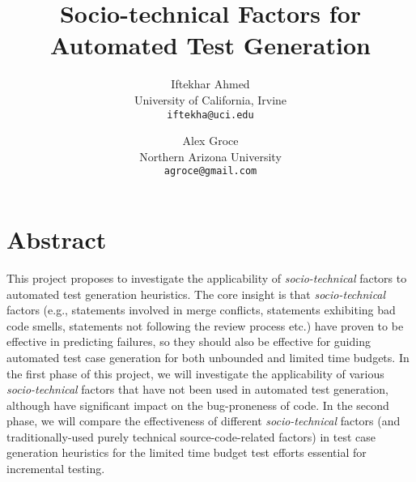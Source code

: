 \documentclass[10pt]{article}
\title{Socio-technical Factors for Automated Test Generation \vspace{-2ex}}
\author{
  Iftekhar Ahmed\\
  University of California, Irvine\\
  \texttt{iftekha@uci.edu} \vspace{-5ex}
  \and
  Alex Groce\\
  Northern Arizona University\\
  \texttt{agroce@gmail.com}\vspace{-5ex}
}
\date{}
\begin{document}
\maketitle


\section{Abstract}

This project proposes to investigate the applicability of \emph{socio-technical} factors to automated test generation heuristics. The core insight is that \emph{socio-technical} factors (e.g., statements involved in merge conflicts, statements exhibiting bad code smells, statements not following the review process  etc.) have proven to be effective in predicting failures, so they should also be effective for guiding automated test case generation for both unbounded and limited time budgets. In the first phase of this project, we will investigate the applicability of various \emph{socio-technical} factors that have not been used in automated test generation, although have significant impact on the bug-proneness of code. In the second phase, we will compare the effectiveness of different \emph{socio-technical} factors (and traditionally-used purely technical source-code-related factors) in test case generation heuristics for the limited time budget test efforts essential for incremental testing.
\end{document}
